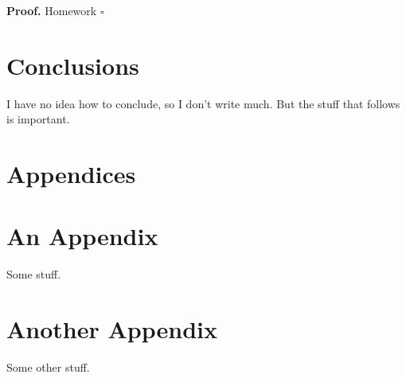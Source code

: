 \documentclass[11pt,twoside]{article}
\numberwithin{Theorem}{section}
\numberwithin{Definition}{section}
\numberwithin{Lemma}{section}
\numberwithin{Algorithm}{section}
\numberwithin{equation}{section}
\begin{document}
\noindent
\textbf{Proof.}
Homework
\hfill $\square$
\cleardoublepage


\section{Conclusions}
I have no idea how to conclude, so I don't write much. But the stuff that follows is important.
\clearpage



\clearpage

\appendix
\section*{Appendices}

\section{An Appendix}
\label{app:one}

Some stuff.
\clearpage

\section{Another Appendix}
\label{app:two}

Some other stuff.
\end{document}
